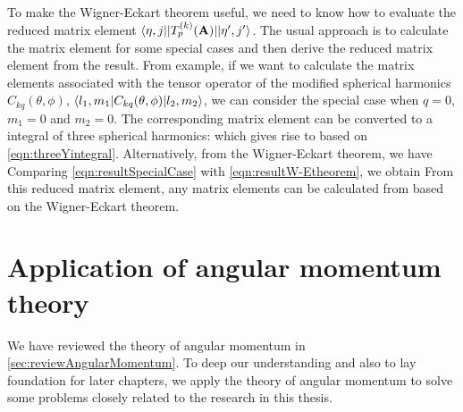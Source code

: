 To make the Wigner-Eckart theorem useful, we need to know how to evaluate the reduced matrix element 
$\langle \eta, j | |T_p^{(k)}(\mathbf{A})|  | \eta^{\prime}, j^{\prime} \rangle$. The usual approach is to calculate the 
matrix element for some special cases and then derive the reduced matrix element from the result. From example,
if we want to calculate the matrix elements associated with the tensor operator of the modified spherical harmonics 
$C_{kq}(\theta, \phi)$, $\langle  l_1, m_1 | C_{kq}(\theta, \phi)  |  l_2, m_2 \rangle$, 
we can consider the special case when $q=0$, $m_1 =0$ and $m_2 =0$. The corresponding matrix element can be converted to a integral of three spherical harmonics:
which gives rise to 
based on \autoref{eqn:threeYintegral}. 
Alternatively, from the Wigner-Eckart theorem, we have
Comparing \autoref{eqn:resultSpecialCase} with \autoref{eqn:resultW-Etheorem}, we obtain
From this reduced matrix element, any matrix elements can be calculated from
based on the Wigner-Eckart theorem.

\section{Application of angular momentum theory}
\label{sec:applicationAMT}

We have reviewed the theory of angular momentum in \autoref{sec:reviewAngularMomentum}. To deep our 
understanding and also to lay foundation for later chapters, we apply the theory of angular momentum to solve some
problems closely related to the research in this thesis. 

